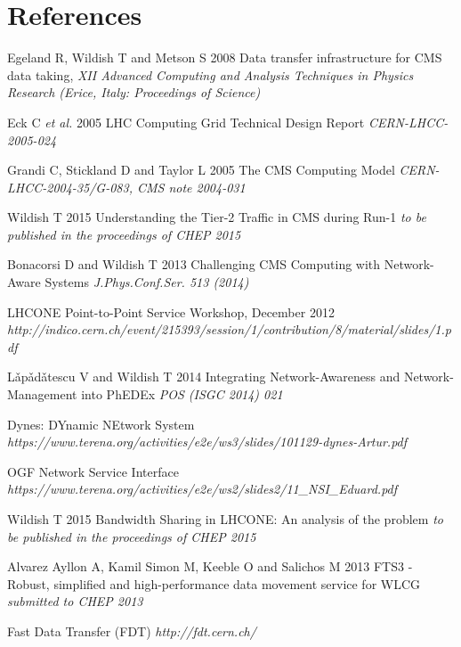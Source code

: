 \section*{References}

\begin{thebibliography}{1}

  Egeland R, Wildish T and Metson S 2008 Data transfer infrastructure for CMS data taking,  {\it XII Advanced Computing and Analysis Techniques in Physics Research (Erice, Italy: Proceedings of Science)}

 Eck C {\it et al.} 2005 LHC Computing Grid Technical Design Report {\it CERN-LHCC-2005-024}

  Grandi C, Stickland D and Taylor L 2005 The CMS Computing Model {\it CERN-LHCC-2004-35/G-083, CMS note 2004-031}

 Wildish T 2015 Understanding the Tier-2 Traffic in CMS during Run-1 {\it to be published in the proceedings of CHEP 2015}

 Bonacorsi D and Wildish T 2013 Challenging CMS Computing with Network-Aware Systems {\it J.Phys.Conf.Ser. 513 (2014)}

 LHCONE Point-to-Point Service Workshop, December 2012 
 {\it http://indico.cern.ch/event/215393/session/1/contribution/8/material/slides/1.pdf}

 L\v{a}p\v{a}d\v{a}tescu V and Wildish T 2014 Integrating Network-Awareness and Network-Management into PhEDEx {\it POS (ISGC 2014) 021}

 Dynes: DYnamic NEtwork System {\it https://www.terena.org/activities/e2e/ws3/slides/101129-dynes-Artur.pdf}


 OGF Network Service Interface {\it https://www.terena.org/activities/e2e/ws2/slides2/11\_NSI\_Eduard.pdf}

 Wildish T 2015 Bandwidth Sharing in LHCONE: An analysis of the problem {\it to be published in the proceedings of CHEP 2015}

 Alvarez Ayllon A, Kamil Simon M, Keeble O and Salichos M 2013 FTS3 - Robust, simplified and high-performance data movement service for WLCG {\it submitted to CHEP 2013}

 Fast Data Transfer (FDT) {\it http://fdt.cern.ch/}

\end{thebibliography}